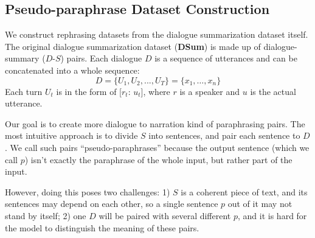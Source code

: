 \subsection{Pseudo-paraphrase Dataset Construction}
\label{sec:rephrasedata}
We construct rephrasing datasets from the dialogue summarization dataset 
itself.  
The original dialogue summarization dataset (\textbf{DSum}) 
is made up of dialogue-summary ($D$-$S$) pairs. Each dialogue $D$
is a sequence of utterances and can be concatenated into a whole sequence: 
\begin{equation}
	D = \{U_1, U_2, ..., U_T\} = \{x_1, \ldots, x_n\}
\end{equation}
Each turn $U_t$ is in the form of [$r_t$: $u_t$], where $r$ is a speaker and 
$u$ is the actual utterance. 

Our goal is to create more dialogue to narration kind of paraphrasing pairs. The most
intuitive approach is to divide $S$ into sentences, and pair each sentence
to $D$. We call such pairs ``pseudo-paraphrases'' because the output
sentence (which we call $p$) isn't exactly the paraphrase of the whole 
input, but rather part of the input.%

However, doing this poses two challenges: 1) $S$ is a coherent piece of 
text, and its sentences may depend on each other, so a single sentence $p$
out of it may not stand by itself; 2) one $D$ will be paired with
several different $p$, and it is hard for the model to distinguish 
the meaning of these pairs. 

